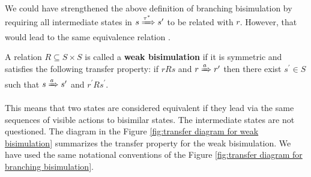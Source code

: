 We could have strengthened the above definition of branching bisimulation by requiring all intermediate states in $s\xRightarrow{\tau^*}s^\prime$ to be related with $r$. However, that would lead to the same equivalence relation \cite{DeNicola95Bisimulations}. 

\begin{definition}
  A relation $R\subseteq S\times S$ is called a  {\bf weak bisimulation} if it is symmetric and satisfies the following transfer property: if $rRs$ and $r\xRightarrow{a} r^\prime$ then there exist $s^\prime\in S$ such that $s \xRightarrow{a} s^\prime$ and $r^\prime Rs^{\prime}$.
\end{definition}

This means that two states are considered equivalent if they lead via the same sequences of visible actions to bisimilar states. The intermediate states are not questioned. The diagram in the Figure \ref{fig:transfer diagram for weak bisimulation} summarizes the transfer property for the weak bisimulation. We have used the same notational conventions of the Figure \ref{fig:transfer diagram for branching bisimulation}.

\begin{figure}
  \centering
  \begin{minipage}{.4\textwidth}
    \centering
    \label{fig:example run of a labeled transition system}
  \end{minipage}
  \hspace{.08\textwidth}
  \begin{minipage}{.5\textwidth}
    \centering
    \label{fig:example run of a labeled transition system with hidden branching before the first action}
  \end{minipage}
\end{figure}


